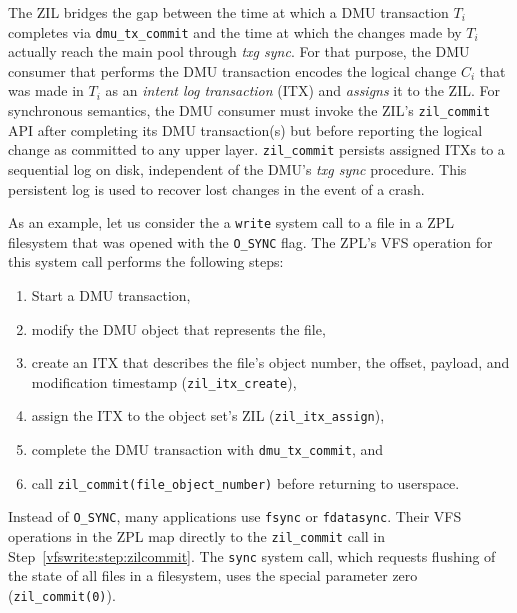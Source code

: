 \documentclass[12pt,a4paper,twoside]{book}
\begin{document}
The ZIL bridges the gap between the time at which a DMU transaction $T_i$ completes via \lstinline{dmu_tx_commit} and the time at which the changes made by $T_i$ actually reach the main pool through \textit{txg sync}.
For that purpose, the DMU consumer that performs the DMU transaction encodes the logical change $C_i$ that was made in $T_i$ as an \textit{intent log transaction} (ITX) and \textit{assigns} it to the ZIL.
For synchronous semantics, the DMU consumer must invoke the ZIL's \lstinline{zil_commit} API after completing its DMU transaction(s) but before reporting the logical change as committed to any upper layer.
\lstinline{zil_commit} persists assigned ITXs to a sequential log on disk, independent of the DMU's \textit{txg sync} procedure.
This persistent log is used to recover lost changes in the event of a crash.

As an example, let us consider the a \lstinline{write} system call to a file in a ZPL filesystem that was opened with the \lstinline{O_SYNC} flag.
The ZPL's VFS operation for this system call performs the following steps:
\begin{enumerate}[noitemsep]
    \item Start a DMU transaction,
    \item modify the DMU object that represents the file,
    \item create an ITX that describes the file's object number, the offset, payload, and modification timestamp (\lstinline{zil_itx_create}),
    \item assign the ITX to the object set's ZIL (\lstinline{zil_itx_assign}),
    \item complete the DMU transaction with \lstinline{dmu_tx_commit}, and
    \item \label{vfswrite:step:zilcommit} call \lstinline{zil_commit(file_object_number)} before returning to userspace.
\end{enumerate}
Instead of \lstinline{O_SYNC}, many applications use \lstinline{fsync} or \lstinline{fdatasync}.
Their VFS operations in the ZPL map directly to the \lstinline{zil_commit} call in Step~\ref{vfswrite:step:zilcommit}.
The \lstinline{sync} system call, which requests flushing of the state of all files in a filesystem, uses the special parameter zero (\lstinline{zil_commit(0)}).
\end{document}

